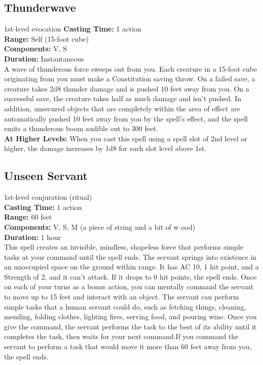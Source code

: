 \documentclass[11pt, A4paper, english]{article}
\begin{document}
		\subsection{Thunderwave}
1st-level evocation
\textbf{Casting Time:} 1 action \\
\textbf{Range:} Self (15-foot cube) \\
\textbf{Components:} V, S \\
\textbf{Duration:} Instantaneous \\
A wave of thunderous force sweeps out from you. Each creature in a 15-foot cube originating from you must make a Constitution saving throw. On a failed save, a creature takes 2d8 thunder damage and is pushed 10 feet away from you. On a successful save, the creature takes half as much damage and isn’t pushed. In addition, unsecured objects that are completely within the area of effect are automatically pushed 10 feet away from you by the spell’s effect, and the spell emits a thunderous boom audible out to 300 feet. \\
\textbf{At Higher Levels:} When you cast this spell using a spell slot of 2nd level or higher, the damage increases by 1d8 for each slot level above 1st.

		\subsection{Unseen Servant}
1st-level conjuration (ritual) \\
\textbf{Casting Time:} 1 action \\
\textbf{Range:} 60 feet \\
\textbf{Components:} V, S, M (a piece of string and a bit of w ood) \\
\textbf{Duration:} 1 hour \\
This spell creates an invisible, mindless, shapeless force that performs simple tasks at your command until the spell ends. The servant springs into existence in an unoccupied space on the ground within range. It has AC 10, 1 hit point, and a Strength of 2, and it can’t attack. If it drops to 0 hit points, the spell ends. Once on each of your turns as a bonus action, you can mentally command the servant to move up to 15 feet and interact with an object. The servant can perform simple tasks that a human servant could do, such as fetching things, cleaning, mending, folding clothes, lighting fires, serving food, and pouring wine. Once you give the command, the servant performs the task to the best of its ability until it completes the task, then waits for your next command.If you command the servant to perform a task that would move it more than 60 feet away from you, the spell ends.
\end{document}
